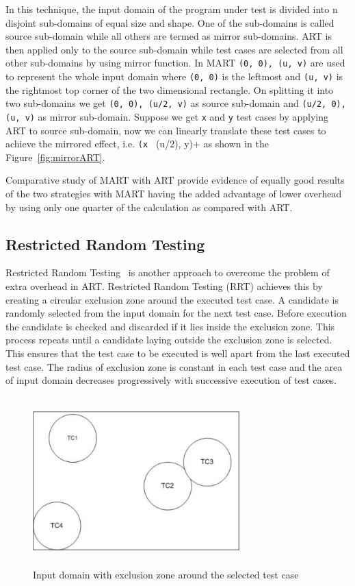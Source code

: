 In this technique, the input domain of the program under test is divided into n disjoint sub-domains of equal size and shape. One of the sub-domains is called source sub-domain while all others are termed as mirror sub-domains. ART is then applied only to the source sub-domain while test cases are selected from all other sub-domains by using mirror function. In MART \verb+(0, 0), (u, v)+ are used to represent the whole input domain where \verb+(0, 0)+ is the leftmost and \verb+(u, v)+ is the rightmost top corner of the two dimensional rectangle. On splitting it into two sub-domains we get \verb+(0, 0), (u/2, v)+ as source sub-domain and \verb+(u/2, 0), (u, v)+ as mirror sub-domain. Suppose we get \verb+x+ and \verb+y+ test cases by applying ART to source sub-domain, now we can linearly translate these test cases to achieve the mirrored effect, i.e. \verb+(x + (u/2), y)+ as shown in the Figure~\ref{fig:mirrorART}. 

Comparative study of MART with ART provide evidence of equally good results of the two strategies with MART having the added advantage of lower overhead by using only one quarter of the calculation as compared with ART.


\subsection{Restricted Random Testing}
Restricted Random Testing~\cite{chan2003normalized} is another approach to overcome the problem of extra overhead in ART. Restricted Random Testing (RRT) achieves this by creating a circular exclusion zone around the executed test case. A candidate is randomly selected from the input domain for the next test case. Before execution the candidate is checked and discarded if it lies inside the exclusion zone. This process repeats until a candidate laying outside the exclusion zone is selected. This ensures that the test case to be executed is well apart from the last executed test case. The radius of exclusion zone is constant in each test case and the area of input domain decreases progressively with successive execution of test cases.

\begin{figure}[h]
	\centering
	\includegraphics[width= 8cm, height = 6.5cm]{chapter2/RRT.pdf}
	\caption{Input domain with exclusion zone around the selected test case}
\end{figure}

